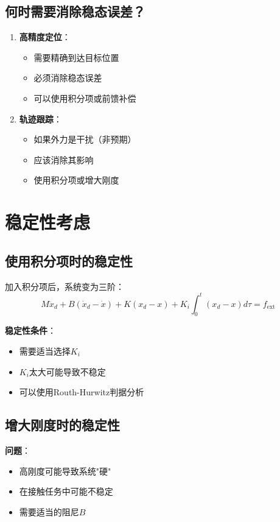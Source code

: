 \documentclass[12pt,a4paper]{article}
\begin{document}
\subsection{何时需要消除稳态误差？}

\begin{enumerate}
\item \textbf{高精度定位}：
\begin{itemize}
\item 需要精确到达目标位置
\item 必须消除稳态误差
\item 可以使用积分项或前馈补偿
\end{itemize}

\item \textbf{轨迹跟踪}：
\begin{itemize}
\item 如果外力是干扰（非预期）
\item 应该消除其影响
\item 使用积分项或增大刚度
\end{itemize}
\end{enumerate}

\section{稳定性考虑}

\subsection{使用积分项时的稳定性}

加入积分项后，系统变为三阶：
\begin{equation}
M\ddot{x}_d + B(\dot{x}_d - \dot{x}) + K(x_d - x) + K_i \int_0^t (x_d - x) d\tau = f_{\text{ext}}
\end{equation}

\textbf{稳定性条件}：
\begin{itemize}
\item 需要适当选择$K_i$
\item $K_i$太大可能导致不稳定
\item 可以使用Routh-Hurwitz判据分析
\end{itemize}

\subsection{增大刚度时的稳定性}

\textbf{问题}：
\begin{itemize}
\item 高刚度可能导致系统"硬"
\item 在接触任务中可能不稳定
\item 需要适当的阻尼$B$
\end{itemize}
\end{document}
